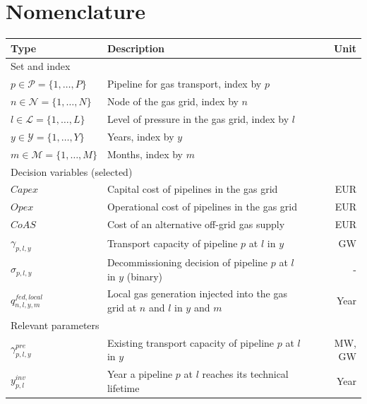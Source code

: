 \documentclass[review]{elsarticle}
\begin{document}
\section*{Nomenclature}
\begin{center}
	\renewcommand{\arraystretch}{1.0}
	\centering
	\small
	\begin{tabular}{lm{8cm}r}
		Type & Description & Unit\\
		\hline
		Set and index & & \\
		\hline
		{$p \in \mathcal{P}=\{1,\ldots,P\}$} & Pipeline for gas transport, index by $p$\\
		{$n \in \mathcal{N}=\{1,\ldots,N\}$} & Node of the gas grid, index by $n$\\
		{$l \in \mathcal{L}=\{1,\ldots,L\}$} & Level of pressure in the gas grid, index by $l$\\
		{$y \in \mathcal{Y}=\{1,\ldots,Y\}$} & Years, index by $y$\\
		{$m \in \mathcal{M}=\{1,\ldots,M\}$} & Months, index by $m$\\
		\hline
		\multicolumn{2}{l}{Decision variables (selected)}\\
		\hline
		{$Capex$} & Capital cost of pipelines in the gas grid & \SI{}{EUR}\\
		{$Opex$} & Operational cost of pipelines in the gas grid & \SI{}{EUR}\\
		{$CoAS$} & Cost of an alternative off-grid gas supply & \SI{}{EUR}\\
		{$\gamma_{p,l,y}$} & Transport capacity of pipeline $p$ at $l$ in $y$& \SI{}{GW}\\
		{$\sigma_{p,l,y}$} & Decommissioning decision of pipeline $p$ at $l$ in $y$ (binary)& -\\
		{$q^{fed, local}_{n, l, y, m}$} & Local gas generation injected into the gas grid at $n$ and $l$ in $y$ and $m$& \SI{}{Year}\\
		\hline
		\multicolumn{2}{l}{Relevant parameters}\\
		\hline
		{$\gamma^{pre}_{p,l,y}$} & Existing transport capacity of pipeline $p$ at $l$ in $y$ & \SI{}{MW}, \SI{}{GW}\\
		{$y^{inv}_{p,l}$} & Year a pipeline $p$ at $l$ reaches its technical lifetime & \SI{}{Year}\\
		
		\hline
	\end{tabular}
\end{center}
\newpage




\newpage



\end{document}
